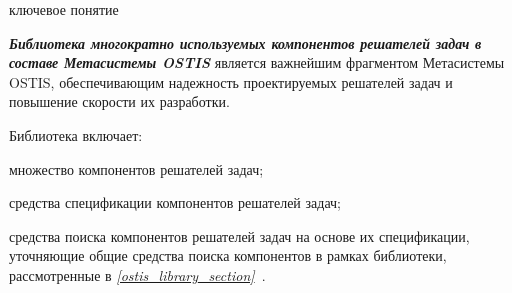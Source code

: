 \begin{SCn}
\bigskip

\begin{scnrelfromlist}{ключевое понятие}
\end{scnrelfromlist}

\end{SCn}



\textbf{\textit{Библиотека многократно используемых компонентов решателей задач в составе Метасистемы OSTIS}} является важнейшим фрагментом Метасистемы OSTIS, обеспечивающим надежность проектируемых решателей задач и повышение скорости их разработки.

Библиотека включает:
\begin{textitemize}
\item множество компонентов решателей задач;
\item средства спецификации компонентов решателей задач;
\item средства поиска компонентов решателей задач на основе их спецификации, уточняющие общие средства поиска компонентов в рамках библиотеки, рассмотренные в \textit{\ref{ostis_library_section}~}.
\end{textitemize}

